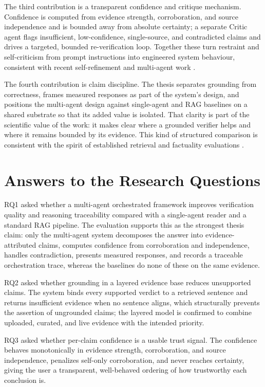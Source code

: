 The third contribution is a transparent confidence and critique mechanism. Confidence is computed from evidence
strength, corroboration, and source independence and is bounded away from absolute certainty; a separate Critic
agent flags insufficient, low-confidence, single-source, and contradicted claims and drives a targeted, bounded
re-verification loop. Together these turn restraint and self-criticism from prompt instructions into engineered
system behaviour, consistent with recent self-refinement and multi-agent work \cite{shinn2023reflexion,yao2023treeofthoughts,asai2024selfrag}.

The fourth contribution is claim discipline. The thesis separates grounding from correctness, frames measured
responses as part of the system's design, and positions the multi-agent design against single-agent and RAG
baselines on a shared substrate so that its added value is isolated. That clarity is part of the scientific value
of the work: it makes clear where a grounded verifier helps and where it remains bounded by its evidence.
This kind of structured comparison is consistent with the spirit of established retrieval and factuality
evaluations \cite{lin2021truthfulqa,petroni2020kilt,ragsurvey2024}.

\section{Answers to the Research Questions }

RQ1 asked whether a multi-agent orchestrated framework improves verification quality and reasoning traceability
compared with a single-agent reader and a standard RAG pipeline. The evaluation supports this as the strongest
thesis claim: only the multi-agent system decomposes the answer into evidence-attributed claims, computes confidence
from corroboration and independence, handles contradiction, presents measured responses, and records a traceable
orchestration trace, whereas the baselines do none of these on the same evidence.

RQ2 asked whether grounding in a layered evidence base reduces unsupported claims. The system binds every supported
verdict to a retrieved sentence and returns insufficient evidence when no sentence aligns, which structurally
prevents the assertion of ungrounded claims; the layered model is confirmed to combine uploaded, curated, and live
evidence with the intended priority.

RQ3 asked whether per-claim confidence is a usable trust signal. The confidence behaves monotonically in evidence
strength, corroboration, and source independence, penalizes self-only corroboration, and never reaches certainty,
giving the user a transparent, well-behaved ordering of how trustworthy each conclusion is.

